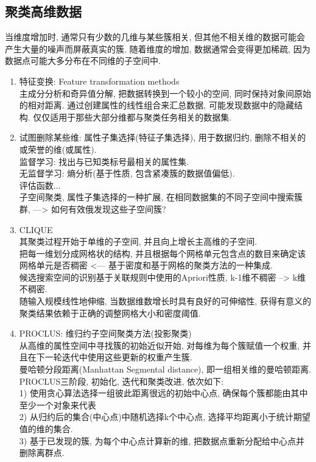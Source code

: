 \documentclass[a4paper,10pt,english]{article}
\begin{document}
\subsection {聚类高维数据}
当维度增加时, 通常只有少数的几维与某些簇相关, 但其他不相关维的数据可能会产生大量的噪声而屏蔽真实的簇. 随着维度的增加, 数据通常会变得更加稀疏, 因为数据点可能大多分布在不同维的子空间中. \\
\begin {enumerate}
\item {特征变换}: Feature transformation methods \\
主成分分析和奇异值分解, 把数据转换到一个较小的空间, 同时保持对象间原始的相对距离. 通过创建属性的线性组合来汇总数据, 可能发现数据中的隐藏结构. 仅仅适用于那些大部分维都与聚类任务相关的数据集.

\item {试图删除某些维}: 属性子集选择(特征子集选择), 用于数据归约, 删除不相关的或荣誉的维(或属性).\\
监督学习: 找出与已知类标号最相关的属性集. \\
无监督学习: 熵分析(基于性质, 包含紧凑簇的数据值偏低). \\
评估函数...\\
子空间聚类, 属性子集选择的一种扩展, 在相同数据集的不同子空间中搜索簇群, ---> 如何有效俄发现这些子空间簇?

\item {CLIQUE}\\
其聚类过程开始于单维的子空间, 并且向上增长主高维的子空间.\\
把每一维划分成网格状的结构, 并且根据每个网格单元包含点的数目来确定该网格单元是否稠密 <--- 基于密度和基于网格的聚类方法的一种集成.\\
候选搜索空间的识别基于关联规则中使用的Apriori性质, k-1维不稠密 --> k维不稠密. \\
随输入规模线性地伸缩, 当数据维数增长时具有良好的可伸缩性, 获得有意义的聚类结果依赖于正确的调整网格大小和密度阈值. \\

\item {PROCLUS}: 维归约子空间聚类方法(投影聚类)\\
从高维的属性空间中寻找簇的初始近似开始, 对每维为每个簇赋值一个权重, 并且在下一轮迭代中使用这些更新的权重产生簇.\\
曼哈顿分段距离(Manhattan Segmental distance), 即一组相关维的曼哈顿距离. \\
PROCLUS三阶段, 初始化, 迭代和聚类改进, 依次如下:\\
1) 使用贪心算法选择一组彼此距离很远的初始中心点, 确保每个簇都能由其中至少一个对象来代表\\
2) 从归约后的集合(中心点)中随机选择k个中心点, 选择平均距离小于统计期望值的维的集合. \\
3) 基于已发现的簇, 为每个中心点计算新的维, 把数据点重新分配给中心点并删除离群点.\\
\end {enumerate}
\end{document}
